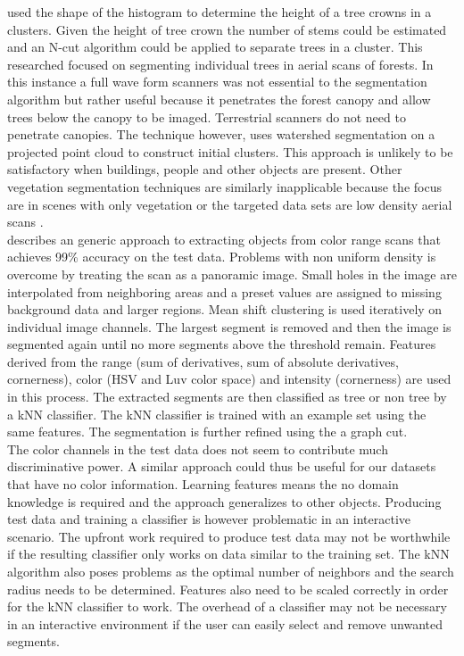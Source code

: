 \citet{Reitberger2009} used the shape of the histogram to determine the height of a tree crowns in a clusters. Given the height of tree crown the number of stems could be estimated and an N-cut algorithm could be applied to separate trees in a cluster. This researched focused on segmenting individual trees in aerial scans of forests. In this instance a full wave form scanners was not essential to the segmentation algorithm but rather useful because it penetrates the forest canopy and allow trees below the canopy to be imaged. Terrestrial scanners do not need to penetrate canopies. The technique however, uses watershed segmentation on a projected point cloud to construct initial clusters. This approach is unlikely to be satisfactory when buildings, people and other objects are present. Other vegetation segmentation techniques are similarly inapplicable because the focus are in scenes with only vegetation \cite{Haugerud2001} or the targeted data sets are low density aerial scans \cite{Charaniya2004}.\\


\citet{Barnea2012} describes an generic approach to extracting objects from color range scans that achieves 99\% accuracy on the test data. Problems with non uniform density is overcome by treating the scan as a panoramic image. Small holes in the image are interpolated from neighboring areas and a preset values are assigned to missing background data and larger regions. Mean shift clustering is used iteratively on individual image channels. The largest segment is removed and then the image is segmented again until no more segments above the threshold remain. Features derived from the range (sum of derivatives, sum of absolute derivatives, cornerness), color (HSV and Luv color space) and intensity (cornerness) are used in this process. The extracted segments are then classified as tree or non tree by a kNN classifier. The kNN classifier is trained with an example set using the same features. The segmentation is further refined using the a graph cut.\\

The color channels in the test data does not seem to contribute much discriminative power. A similar approach could thus be useful for our datasets that have no color information. Learning features means the no domain knowledge is required and the approach generalizes to other objects. Producing test data and training a classifier is however problematic in an interactive scenario. The upfront work required to produce test data may not be worthwhile if the resulting classifier only works on data similar to the training set. The kNN algorithm also poses problems as the optimal number of neighbors and the search radius needs to be determined. Features also need to be scaled correctly in order for the kNN classifier to work. The overhead of a classifier may not be necessary in an interactive environment if the user can easily select and remove unwanted segments.\\



